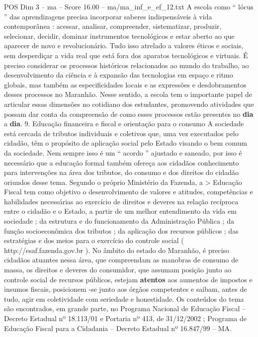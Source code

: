 \begin{textsample}{POS Dim 3 – ma – Score 16.00 – ma/ma\_inf\_e\_ef\_12.txt}
A escola como “ lócus ” das aprendizagens precisa incorporar saberes indispensáveis à vida contemporânea : acessar, analisar, compreender, sistematizar, produzir, selecionar, decidir, dominar instrumentos tecnológicos e estar aberto ao que aparecer de novo e revolucionário.
Tudo isso atrelado a valores éticos e sociais, sem desperdiçar a vida real que está fora dos aparatos tecnológicos e virtuais.
É preciso considerar os processos históricos relacionados ao mundo do trabalho, ao desenvolvimento da ciência e à expansão das tecnologias em espaço e ritmo globais, mas também as especificidades locais e as expressões e desdobramentos desses processos no Maranhão.
Nesse sentido, a escola tem o importante papel de articular essas dimensões no cotidiano dos estudantes, promovendo atividades que possam dar conta da compreensão de como esses processos estão presentes no \textbf{dia} a \textbf{dia}. 9.
Educação financeira e fiscal e orientação para o consumo A sociedade está cercada de tributos individuais e coletivos que, uma vez executados pelo cidadão, têm o propósito de aplicação social pelo Estado visando o bem comum da sociedade.
Nem sempre isso é um “ acordo ” ajustado e saneado, por isso é necessário que a educação formal também ofereça aos cidadãos conhecimento para intervenções na área dos tributos, do consumo e dos direitos do cidadão oriundos desse tema.
Segundo o próprio Ministério da Fazenda, a > Educação Fiscal tem como objetivo o desenvolvimento de valores e atitudes, competências e habilidades necessárias ao exercício de direitos e deveres na relação recíproca entre o cidadão e o Estado, a partir de um melhor entendimento da vida em sociedade ; da estrutura e do funcionamento da Administração Pública ; da função socioeconômica dos tributos ; da aplicação dos recursos públicos ; das estratégias e dos meios para o exercício do controle social ( http://esaf.fazenda.gov.br ).
No âmbito do estado do Maranhão, é preciso cidadãos atuantes nessa área, que compreendam as manobras de consumo de massa, os direitos e deveres do consumidor, que assumam posição junto ao controle social de recursos públicos, estejam \textbf{atentos} aos aumentos de impostos e insumos fiscais, posicionem -se junto aos órgãos competentes e saibam, antes de tudo, agir em coletividade com seriedade e honestidade.
Os conteúdos do tema são encontrados, em grande parte, no Programa Nacional de Educação Fiscal – Decreto Estadual nº 18.113/01 e Portaria nº 413, de 31/12/2002 ; Programa de Educação Fiscal para a Cidadania – Decreto Estadual nº 16.847/99 – MA.

\end{textsample}
